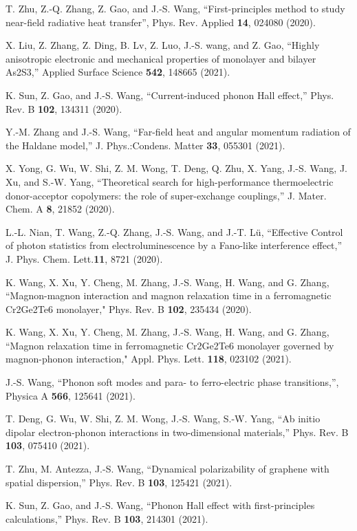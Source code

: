 \itm T. Zhu, Z.-Q. Zhang, Z. Gao, and J.-S. Wang, 
``First-principles method to study near-field radiative heat transfer'',
 Phys. Rev. Applied {\bf 14}, 024080 (2020).

\itm  X. Liu, Z. Zhang, Z. Ding, B. Lv, Z. Luo, J.-S. wang, and Z. Gao,
 ``Highly anisotropic electronic and mechanical properties of monolayer and bilayer As2S3,'' 
 Applied Surface Science {\bf 542}, 148665 (2021).

\itm  K. Sun, Z. Gao, and J.-S. Wang, ``Current-induced phonon Hall effect,'' 
Phys. Rev. B {\bf 102}, 134311 (2020).

\itm  Y.-M. Zhang and J.-S. Wang, ``Far-field heat and angular momentum radiation of the Haldane model,''
J. Phys.:Condens. Matter {\bf 33}, 055301 (2021).

\itm X. Yong, G. Wu, W. Shi, Z. M. Wong, T. Deng, Q. Zhu, X. Yang, J.-S. Wang, J. Xu, and S.-W. Yang,
 ``Theoretical search for high-performance thermoelectric donor-acceptor copolymers: the role of super-exchange couplings,''
  J. Mater. Chem. A {\bf 8}, 21852 (2020).

\itm L.-L. Nian, T. Wang, Z.-Q. Zhang, J.-S. Wang, and J.-T. Lü,
 ``Effective Control of photon statistics from electroluminescence by a Fano-like interference effect,'' 
 J. Phys. Chem. Lett.{\bf 11}, 8721 (2020).

\itm K. Wang, X. Xu, Y. Cheng, M. Zhang, J.-S. Wang, H. Wang, and G. Zhang, 
``Magnon-magnon interaction and magnon relaxation time in a ferromagnetic Cr2Ge2Te6 monolayer," 
Phys. Rev. B {\bf 102}, 235434 (2020).

\itm K. Wang, X. Xu, Y. Cheng, M. Zhang, J.-S. Wang, H. Wang, and G. Zhang, 
``Magnon relaxation time in ferromagnetic Cr2Ge2Te6 monolayer governed by magnon-phonon interaction,"
 Appl. Phys. Lett. {\bf 118}, 023102 (2021).

\itm  J.-S. Wang, ``Phonon soft modes and para- to ferro-electric phase transitions,'', 
Physica A {\bf 566}, 125641 (2021).

\itm T. Deng, G. Wu, W. Shi, Z. M. Wong, J.-S. Wang, S.-W. Yang, 
``Ab initio dipolar electron-phonon interactions in two-dimensional materials,''
 Phys. Rev. B {\bf 103}, 075410 (2021).

\itm T. Zhu, M. Antezza, J.-S. Wang, ``Dynamical polarizability of graphene with spatial dispersion,''
 Phys. Rev. B {\bf 103}, 125421 (2021).

\itm  K. Sun, Z. Gao, and J.-S. Wang, ``Phonon Hall effect with first-principles calculations,''
 Phys. Rev. B {\bf 103}, 214301 (2021).

